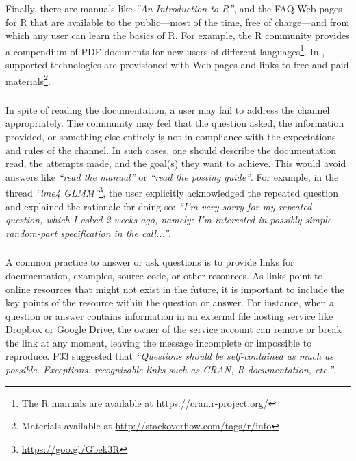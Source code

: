     Finally, there are manuals like \textit{``An Introduction to R''}, and the FAQ Web pages for R that are available to the public---most of the time, free of charge---and from which any user can learn the basics of R.
    For example, the R community provides a compendium of PDF documents for new users of different languages\footnote{The R manuals are available at \url{https://cran.r-project.org/}}.
    In \SO, supported technologies are provisioned with Web pages and links to free and paid materials\footnote{Materials available at \url{http://stackoverflow.com/tags/r/info}}.



\subsubsection{\recc}

    In spite of reading the documentation, a user may fail to address the channel appropriately.
    The community may feel that the question asked, the information provided, or something else entirely is not in compliance with the expectations and rules of the channel.
    In such cases, one should describe the documentation read, the attempts made, and the goal(s) they want to achieve.
    This would avoid answers like \textit{``read the manual''} or \textit{``read the posting guide''}. %
    For example, in the thread \textit{``lme4 GLMM''}\footnote{\url{https://goo.gl/Gbek3R}}, the user explicitly acknowledged the repeated question and explained the rationale for doing so: \textit{``I'm very sorry for my repeated question, which I asked 2 weeks ago, namely: I'm interested in possibly simple random-part specification in the call...''}.


\subsubsection{\recd}

    A common practice to answer or ask questions is to provide links for documentation, examples, source code, or other resources.
    As links point to online resources that might not exist in the future, it is important to include the key points of the resource within the question or answer.
    For instance, when a question or answer contains information in an external file hosting service like Dropbox or Google Drive, the owner of the service account can remove or break the link at any moment, leaving the message incomplete or impossible to reproduce. %
    P33 suggested that \textit{``Questions should be self-contained as much as possible. Exceptions: recognizable links such as CRAN, R documentation, etc.''}.

